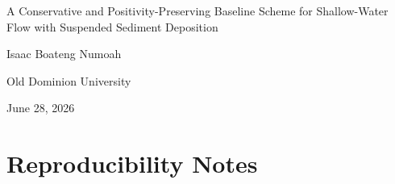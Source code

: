 \documentclass[a4paper,12pt]{article}
\newcommand{\PaperTitle}{A Conservative and Positivity-Preserving Baseline Scheme for Shallow-Water Flow with Suspended Sediment Deposition}
\newcommand{\PaperAuthor}{Isaac Boateng Numoah}
\newcommand{\PaperDate}{June 28, 2026}
\begin{document}
\thispagestyle{empty}
\vspace*{4em}
\begin{center}
  \LARGE \PaperTitle
\end{center}
\vspace{2em}
\begin{center}
  \large \PaperAuthor
\end{center}
\begin{center}
  \large Old Dominion University
\end{center}
\vspace{8em}
\begin{center}
  \PaperDate
\end{center}
\vspace{3em}
\begin{abstract}
This paper studies a periodic, flat-bed, first-order finite-volume baseline for shallow-water flow coupled to suspended sediment advection and exact deposition into a separate storage variable. The scheme uses a Rusanov hydrodynamic flux, shared interface velocities computed after hydrodynamics, and a local exact deposition update. Under strict wetness and stated CFL restrictions, the baseline theorem proves exact discrete water-mass conservation, exact suspended-plus-stored sediment-volume conservation, a one-step positive-depth bound, nonnegative suspended sediment, and nonnegative concentration. Synthetic theorem-component diagnostics verify that the implementation follows these proved quantities to floating-point tolerance. The scope is restricted: there is no real-river validation, no novelty claim, no nonflat bathymetry, no open boundary, no diffusion, no wetting/drying, and no moving-bed hydrodynamic feedback.
\end{abstract}
\newpage

\pagestyle{empty}
\tableofcontents
\newpage

\pagestyle{fancy}

\pagebreak[100]

\pagebreak[100]

\pagebreak[100]

\pagebreak[100]



\pagebreak[100]


\pagebreak[100]


\pagebreak[100]
\appendix
\section{Reproducibility Notes}

\end{document}
